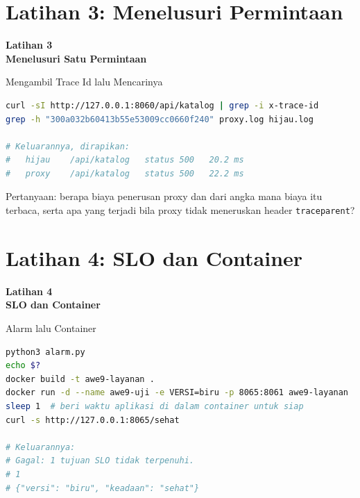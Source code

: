 \documentclass[aspectratio=169, table, 12pt]{beamer}
\begin{document}
\section{Latihan 3: Menelusuri Permintaan}

\begin{frame}{\hfill}
  \centering
  \Huge{\textbf{Latihan 3\\Menelusuri Satu Permintaan}}
\end{frame}

\begin{frame}[fragile]{{\Large Mengambil Trace Id lalu Mencarinya}}
  \vspace{2pt}
\begin{lstlisting}[language=bash]
curl -sI http://127.0.0.1:8060/api/katalog | grep -i x-trace-id
grep -h "300a032b60413b55e53009cc0660f240" proxy.log hijau.log

# Keluarannya, dirapikan:
#   hijau    /api/katalog   status 500   20.2 ms
#   proxy    /api/katalog   status 500   22.2 ms
\end{lstlisting}
  \vspace{4pt}
  {\footnotesize Pertanyaan: berapa biaya penerusan proxy dan dari angka mana
  biaya itu terbaca, serta apa yang terjadi bila proxy tidak meneruskan
  header \texttt{traceparent}?}
\end{frame}

\section{Latihan 4: SLO dan Container}

\begin{frame}{\hfill}
  \centering
  \Huge{\textbf{Latihan 4\\SLO dan Container}}
\end{frame}

\begin{frame}[fragile]{{\Large Alarm lalu Container}}
  \vspace{2pt}
\begin{lstlisting}[language=bash]
python3 alarm.py
echo $?
docker build -t awe9-layanan .
docker run -d --name awe9-uji -e VERSI=biru -p 8065:8061 awe9-layanan
sleep 1  # beri waktu aplikasi di dalam container untuk siap
curl -s http://127.0.0.1:8065/sehat

# Keluarannya:
# Gagal: 1 tujuan SLO tidak terpenuhi.
# 1
# {"versi": "biru", "keadaan": "sehat"}
\end{lstlisting}
\end{frame}
\end{document}

